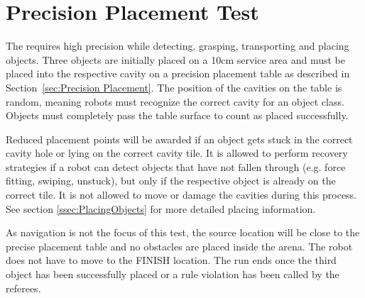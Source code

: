 \newpage
\section{Precision Placement Test}
\label{sec:Precision Placement Test}

The  requires high precision while detecting, grasping, transporting and placing objects. Three objects are initially placed on a 10cm service area and must be placed into the respective cavity on a precision placement table as described in Section~\ref{sec:Precision Placement}. The position of the cavities on the table is random, meaning robots must recognize the correct cavity for an object class. Objects must completely pass the table surface to count as placed successfully.

Reduced placement points will be awarded if an object gets stuck in the correct cavity hole or lying on the correct cavity tile. It is allowed to perform recovery strategies if a robot can detect objects that have not fallen through (e.g. force fitting, swiping, unstuck), but only if the respective object is already on the correct tile.
It is not allowed to move or damage the cavities during this process. See section \ref{ssec:PlacingObjects} for more detailed placing information.

As navigation is not the focus of this test, the source location will be close to the precise placement table and no obstacles are placed inside the arena. The robot does not have to move to the FINISH location. The run ends once the third object has been successfully placed or a rule violation has been called by the referees.

